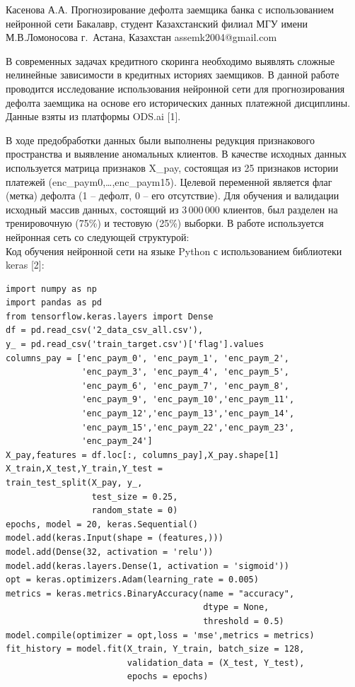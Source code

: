 \documentclass{msukz}	%
\begin{document}
\info %
{Касенова А.А.}										%
{Прогнозирование дефолта заемщика банка с использованием нейронной сети}	%
{Бакалавр, студент}											%
{Казахстанский филиал МГУ имени М.В.Ломоносова}					%
{г.~Астана, Казахстан}											%
{assemk2004@gmail.com}									%

В современных задачах кредитного скоринга необходимо выявлять сложные нелинейные зависимости в кредитных историях заемщиков. В данной работе проводится исследование использования нейронной сети для прогнозирования дефолта заемщика на основе его исторических данных платежной дисциплины. Данные взяты из платформы ODS.ai [1].
  
В ходе предобработки данных были выполнены редукция признакового пространства и выявление аномальных клиентов. В качестве исходных данных используется матрица признаков X\_pay, состоящая из 25 признаков истории платежей (enc\_paym0,\dots,enc\_paym15). Целевой переменной является флаг (метка) дефолта (1 -- дефолт, 0 -- его отсутствие). Для обучения и валидации исходный массив данных, состоящий из 3\,000\,000 клиентов, был разделен на тренировочную (75\%) и тестовую (25\%) выборки.
В работе используется нейронная сеть со следующей структурой:
 \\

Код обучения нейронной сети на языке Python с использованием библиотеки keras [2]:
\begin{lstlisting}
import numpy as np
import pandas as pd
from tensorflow.keras.layers import Dense
df = pd.read_csv('2_data_csv_all.csv'),
y_ = pd.read_csv('train_target.csv')['flag'].values 
columns_pay = ['enc_paym_0', 'enc_paym_1', 'enc_paym_2',
               'enc_paym_3', 'enc_paym_4', 'enc_paym_5', 
               'enc_paym_6', 'enc_paym_7', 'enc_paym_8', 
               'enc_paym_9', 'enc_paym_10','enc_paym_11', 
               'enc_paym_12','enc_paym_13','enc_paym_14', 
               'enc_paym_15','enc_paym_22','enc_paym_23', 
               'enc_paym_24']
X_pay,features = df.loc[:, columns_pay],X_pay.shape[1] 
X_train,X_test,Y_train,Y_test =
train_test_split(X_pay, y_, 
                 test_size = 0.25, 
                 random_state = 0)
epochs, model = 20, keras.Sequential()
model.add(keras.Input(shape = (features,)))  
model.add(Dense(32, activation = 'relu'))   
model.add(keras.layers.Dense(1, activation = 'sigmoid'))
opt = keras.optimizers.Adam(learning_rate = 0.005)
metrics = keras.metrics.BinaryAccuracy(name = "accuracy", 
                                       dtype = None, 
                                       threshold = 0.5)
model.compile(optimizer = opt,loss = 'mse',metrics = metrics)
fit_history = model.fit(X_train, Y_train, batch_size = 128,
                        validation_data = (X_test, Y_test), 
                        epochs = epochs)
\end{lstlisting}
\end{document}
